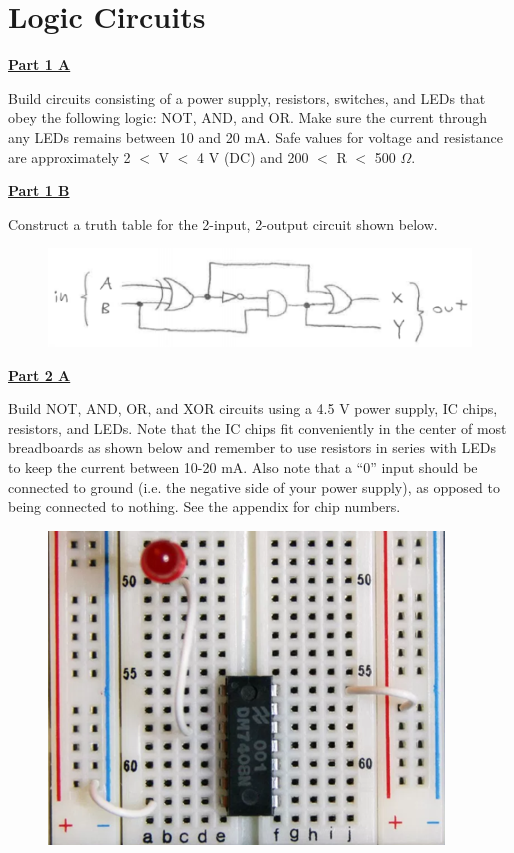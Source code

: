 \section{Logic Circuits}

\underline{\textbf{Part 1 A}} \par

Build circuits consisting of a power supply, resistors, switches, and LEDs that obey the following logic: NOT, AND, and OR.
Make sure the current through any LEDs remains between 10 and 20 mA.
Safe values for voltage and resistance are approximately 2 $<$ V $<$ 4 V (DC) and 200 $<$ R $<$ 500 $\Omega$.  

\vspace{\baselineskip}

\underline{\textbf{Part 1 B}} \par

Construct a truth table for the 2-input, 2-output circuit shown below.

\begin{figure}[H]
\includegraphics[scale=0.80]{figures/logic-circuits/fig1.png}
\end{figure}

\underline{\textbf{Part 2 A}} \par

Build NOT, AND, OR, and XOR circuits using a 4.5 V power supply, IC chips, resistors, and LEDs.
Note that the IC chips fit conveniently in the center of most breadboards as shown below and remember to use resistors in series with LEDs to keep the current between 10-20 mA.
Also note that a ``0'' input should be connected to ground (i.e. the negative side of your power supply), as opposed to being connected to nothing.
See the appendix for chip numbers.

\begin{figure}[H]
\includegraphics[scale=0.85]{figures/logic-circuits/fig2.png}
\end{figure}

